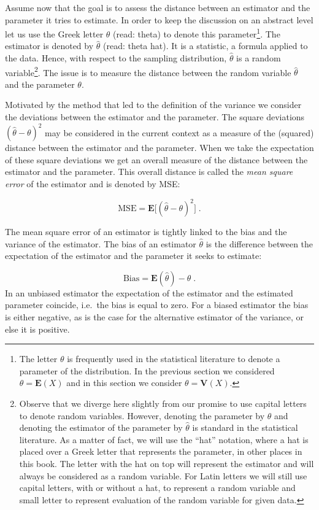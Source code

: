 \documentclass[
]{krantz}
\newcommand{\Expec}{\mathbf{E}}
\newcommand{\Var}{\mathbf{V}}
\theoremstyle{definition}
\theoremstyle{definition}
\theoremstyle{definition}
\theoremstyle{remark}
\begin{document}
Assume now that the goal is to assess the distance between an estimator
and the parameter it tries to estimate. In order to keep the discussion
on an abstract level let us use the Greek letter \(\theta\) (read: theta)
to denote this parameter\footnote{The letter \(\theta\) is frequently used in the statistical
  literature to denote a parameter of the distribution. In the
  previous section we considered \(\theta = \Expec(X)\) and in this
  section we consider \(\theta=\Var(X)\).}. The estimator is denoted by \(\hat \theta\)
(read: theta hat). It is a statistic, a formula applied to the data.
Hence, with respect to the sampling distribution, \(\hat \theta\) is a
random variable\footnote{Observe that we diverge here slightly from our promise to use
  capital letters to denote random variables. However, denoting the
  parameter by \(\theta\) and denoting the estimator of the parameter by
  \(\hat \theta\) is standard in the statistical literature. As a matter
  of fact, we will use the ``hat'' notation, where a hat is placed over
  a Greek letter that represents the parameter, in other places in
  this book. The letter with the hat on top will represent the
  estimator and will always be considered as a random variable. For
  Latin letters we will still use capital letters, with or without a
  hat, to represent a random variable and small letter to represent
  evaluation of the random variable for given data.}. The issue is to measure the distance between the
random variable \(\hat \theta\) and the parameter \(\theta\).

Motivated by the method that led to the definition of the variance we
consider the deviations between the estimator and the parameter. The
square deviations \((\hat \theta - \theta)^2\) may be considered in the
current context as a measure of the (squared) distance between the
estimator and the parameter. When we take the expectation of these
square deviations we get an overall measure of the distance between the
estimator and the parameter. This overall distance is called the \emph{mean
square error} of the estimator and is denoted by MSE:

\[\mathrm{MSE} = \Expec\big[(\hat \theta - \theta)^2\big]\;.\]

The mean square error of an estimator is tightly linked to the bias and
the variance of the estimator. The bias of an estimator \(\hat \theta\) is
the difference between the expectation of the estimator and the
parameter it seeks to estimate:

\[\mathrm{Bias} = \Expec(\hat \theta) - \theta\;.\] In an unbiased
estimator the expectation of the estimator and the estimated parameter
coincide, i.e.~the bias is equal to zero. For a biased estimator the
bias is either negative, as is the case for the alternative estimator of
the variance, or else it is positive.
\end{document}
